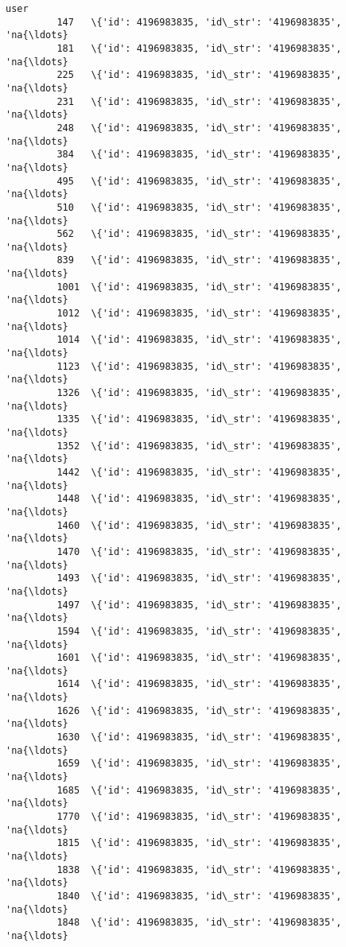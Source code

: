 \documentclass[11pt]{article}
\begin{document}
\begin{Verbatim}[commandchars=\\\{\}]
                                                            user  
         147   \{'id': 4196983835, 'id\_str': '4196983835', 'na{\ldots}  
         181   \{'id': 4196983835, 'id\_str': '4196983835', 'na{\ldots}  
         225   \{'id': 4196983835, 'id\_str': '4196983835', 'na{\ldots}  
         231   \{'id': 4196983835, 'id\_str': '4196983835', 'na{\ldots}  
         248   \{'id': 4196983835, 'id\_str': '4196983835', 'na{\ldots}  
         384   \{'id': 4196983835, 'id\_str': '4196983835', 'na{\ldots}  
         495   \{'id': 4196983835, 'id\_str': '4196983835', 'na{\ldots}  
         510   \{'id': 4196983835, 'id\_str': '4196983835', 'na{\ldots}  
         562   \{'id': 4196983835, 'id\_str': '4196983835', 'na{\ldots}  
         839   \{'id': 4196983835, 'id\_str': '4196983835', 'na{\ldots}  
         1001  \{'id': 4196983835, 'id\_str': '4196983835', 'na{\ldots}  
         1012  \{'id': 4196983835, 'id\_str': '4196983835', 'na{\ldots}  
         1014  \{'id': 4196983835, 'id\_str': '4196983835', 'na{\ldots}  
         1123  \{'id': 4196983835, 'id\_str': '4196983835', 'na{\ldots}  
         1326  \{'id': 4196983835, 'id\_str': '4196983835', 'na{\ldots}  
         1335  \{'id': 4196983835, 'id\_str': '4196983835', 'na{\ldots}  
         1352  \{'id': 4196983835, 'id\_str': '4196983835', 'na{\ldots}  
         1442  \{'id': 4196983835, 'id\_str': '4196983835', 'na{\ldots}  
         1448  \{'id': 4196983835, 'id\_str': '4196983835', 'na{\ldots}  
         1460  \{'id': 4196983835, 'id\_str': '4196983835', 'na{\ldots}  
         1470  \{'id': 4196983835, 'id\_str': '4196983835', 'na{\ldots}  
         1493  \{'id': 4196983835, 'id\_str': '4196983835', 'na{\ldots}  
         1497  \{'id': 4196983835, 'id\_str': '4196983835', 'na{\ldots}  
         1594  \{'id': 4196983835, 'id\_str': '4196983835', 'na{\ldots}  
         1601  \{'id': 4196983835, 'id\_str': '4196983835', 'na{\ldots}  
         1614  \{'id': 4196983835, 'id\_str': '4196983835', 'na{\ldots}  
         1626  \{'id': 4196983835, 'id\_str': '4196983835', 'na{\ldots}  
         1630  \{'id': 4196983835, 'id\_str': '4196983835', 'na{\ldots}  
         1659  \{'id': 4196983835, 'id\_str': '4196983835', 'na{\ldots}  
         1685  \{'id': 4196983835, 'id\_str': '4196983835', 'na{\ldots}  
         1770  \{'id': 4196983835, 'id\_str': '4196983835', 'na{\ldots}  
         1815  \{'id': 4196983835, 'id\_str': '4196983835', 'na{\ldots}  
         1838  \{'id': 4196983835, 'id\_str': '4196983835', 'na{\ldots}  
         1840  \{'id': 4196983835, 'id\_str': '4196983835', 'na{\ldots}  
         1848  \{'id': 4196983835, 'id\_str': '4196983835', 'na{\ldots}  

\end{Verbatim}
\end{document}
